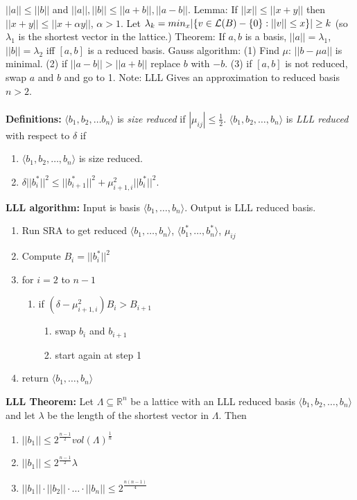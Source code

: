 $||a|| \leq ||b||$ and $||a||, ||b|| \leq ||a+b||, ||a-b||$.
Lemma: If $||x|| \leq ||x+y||$ then $||x+y|| \leq ||x+ \alpha y||$, $\alpha > 1$.
Let $\lambda_k = min_{x} |\{ v \in {\cal L}(B)-\{0\} : ||v|| \leq x\}| \geq k$
(so $\lambda_1$ is the shortest
vector in the lattice.)
Theorem: If $a, b$ is a basis, $||a|| = \lambda_1$, $||b||= \lambda_2$ iff $[a, b]$
is a reduced basis.
Gauss algorithm: (1) Find $\mu$: $||b-\mu a||$ is minimal.  
(2) if $||a-b||>||a+b||$ replace
$b$ with $-b$. (3) if $[a, b]$ is not reduced, swap $a$ and $b$ and go to 1.
Note: LLL Gives an approximation to reduced basis $n>2$.  \\
\\
{\bf Definitions: }  $\langle b_1, b_2, \ldots b_n \rangle$ is \emph{size reduced} if $|\mu_{ij}| \leq {\frac 1 2}$.
$\langle b_1 , b_2 , \ldots , b_n \rangle$ is \emph{LLL reduced}
with respect to $\delta$ if
\begin{enumerate}
\item  $\langle b_1 , b_2 , \ldots , b_n \rangle$ is size reduced.
\item $\delta ||b_i^*||^2 \leq ||b_{i+1}^*||^2 + \mu_{i+1,i}^2 ||b_i^*||^2$.
\end{enumerate}
{\bf LLL algorithm:} Input is basis $\langle b_1 , \ldots , b_n \rangle$.  Output is
LLL reduced basis.
\begin{enumerate}
\item Run SRA to get reduced $\langle b_1 , \ldots , b_n \rangle$,
$\langle b_1^* , \ldots , b_n^* \rangle$, $\mu_{ij}$
\item Compute $B_i = ||b_i^*||^2$
\item for $i=2$ to $n-1$
\begin{enumerate}[label*=\arabic*.]
\item if $(\delta - \mu_{i+1,i}^2)B_i > B_{i+1}$
\begin{enumerate}[label*=\arabic*.]
\item swap $b_i$ and $b_{i+1}$
\item start again at step 1
\end{enumerate}
\end{enumerate}
\item return $\langle b_1 , \ldots , b_n \rangle$
\end{enumerate}
{\bf LLL Theorem: } Let $\Lambda \subseteq {\mathbb R}^n$ be a lattice with an LLL reduced basis
$\langle b_1 , b_2 , \ldots , b_n \rangle$ and let $\lambda$ be the length of the shortest vector in $\Lambda$.  Then
\begin{enumerate}
\item $||b_1|| \leq 2^{\frac {n-1} {2}} vol(\Lambda)^{\frac 1 n}$
\item $||b_1|| \leq 2^{\frac {n-1} 2} \lambda$
\item $||b_1|| \cdot ||b_2|| \cdot \ldots \cdot ||b_n|| \leq 2^{\frac {n(n-1)} {4}}$
\end{enumerate}
